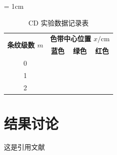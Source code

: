 \documentclass[fontset=windows]{article}
\begin{document}
\begin{table}[htbp]
    \centering
    \caption{CD 实验数据记录表}
    \label{table2}
    \renewcommand\arraystretch{1.5}
    \tabcolsep = 1cm
    \begin{tabular}{|c|c|c|c|}
        \hline
        \multirow{2}{*}{\textbf{条纹级数 $m$}} & \multicolumn{3}{|c|}{\textbf{色带中心位置 $x/\mathrm{cm}$}}\\
        \cline{2-4} %
        & \textbf{蓝色} & \textbf{绿色} & \textbf{红色} \\
        \hline
        0 & & & \\
        \hline
        1 & & & \\
        \hline
        2 & & & \\
        \hline
    \end{tabular}
\end{table}

\section{结果讨论}




\begin{thebibliography}{30}

     这是引用文献

\end{thebibliography}
\end{document}
